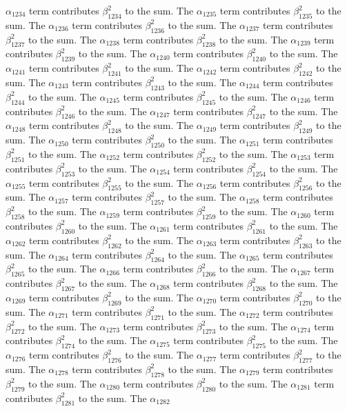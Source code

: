 \begin{lemma}
$\alpha_{1234}$ term contributes $\beta_{1234}^{2}$ to the sum. The $\alpha_{1235}$ term contributes $\beta_{1235}^{2}$ to the sum. The $\alpha_{1236}$ term contributes $\beta_{1236}^{2}$ to the sum. The $\alpha_{1237}$ term contributes $\beta_{1237}^{2}$ to the sum. The $\alpha_{1238}$ term contributes $\beta_{1238}^{2}$ to the sum. The $\alpha_{1239}$ term contributes $\beta_{1239}^{2}$ to the sum. The $\alpha_{1240}$ term contributes $\beta_{1240}^{2}$ to the sum. The $\alpha_{1241}$ term contributes $\beta_{1241}^{2}$ to the sum. The $\alpha_{1242}$ term contributes $\beta_{1242}^{2}$ to the sum. The $\alpha_{1243}$ term contributes $\beta_{1243}^{2}$ to the sum. The $\alpha_{1244}$ term contributes $\beta_{1244}^{2}$ to the sum. The $\alpha_{1245}$ term contributes $\beta_{1245}^{2}$ to the sum. The $\alpha_{1246}$ term contributes $\beta_{1246}^{2}$ to the sum. The $\alpha_{1247}$ term contributes $\beta_{1247}^{2}$ to the sum. The $\alpha_{1248}$ term contributes $\beta_{1248}^{2}$ to the sum. The $\alpha_{1249}$ term contributes $\beta_{1249}^{2}$ to the sum. The $\alpha_{1250}$ term contributes $\beta_{1250}^{2}$ to the sum. The $\alpha_{1251}$ term contributes $\beta_{1251}^{2}$ to the sum. The $\alpha_{1252}$ term contributes $\beta_{1252}^{2}$ to the sum. The $\alpha_{1253}$ term contributes $\beta_{1253}^{2}$ to the sum. The $\alpha_{1254}$ term contributes $\beta_{1254}^{2}$ to the sum. The $\alpha_{1255}$ term contributes $\beta_{1255}^{2}$ to the sum. The $\alpha_{1256}$ term contributes $\beta_{1256}^{2}$ to the sum. The $\alpha_{1257}$ term contributes $\beta_{1257}^{2}$ to the sum. The $\alpha_{1258}$ term contributes $\beta_{1258}^{2}$ to the sum. The $\alpha_{1259}$ term contributes $\beta_{1259}^{2}$ to the sum. The $\alpha_{1260}$ term contributes $\beta_{1260}^{2}$ to the sum. The $\alpha_{1261}$ term contributes $\beta_{1261}^{2}$ to the sum. The $\alpha_{1262}$ term contributes $\beta_{1262}^{2}$ to the sum. The $\alpha_{1263}$ term contributes $\beta_{1263}^{2}$ to the sum. The $\alpha_{1264}$ term contributes $\beta_{1264}^{2}$ to the sum. The $\alpha_{1265}$ term contributes $\beta_{1265}^{2}$ to the sum. The $\alpha_{1266}$ term contributes $\beta_{1266}^{2}$ to the sum. The $\alpha_{1267}$ term contributes $\beta_{1267}^{2}$ to the sum. The $\alpha_{1268}$ term contributes $\beta_{1268}^{2}$ to the sum. The $\alpha_{1269}$ term contributes $\beta_{1269}^{2}$ to the sum. The $\alpha_{1270}$ term contributes $\beta_{1270}^{2}$ to the sum. The $\alpha_{1271}$ term contributes $\beta_{1271}^{2}$ to the sum. The $\alpha_{1272}$ term contributes $\beta_{1272}^{2}$ to the sum. The $\alpha_{1273}$ term contributes $\beta_{1273}^{2}$ to the sum. The $\alpha_{1274}$ term contributes $\beta_{1274}^{2}$ to the sum. The $\alpha_{1275}$ term contributes $\beta_{1275}^{2}$ to the sum. The $\alpha_{1276}$ term contributes $\beta_{1276}^{2}$ to the sum. The $\alpha_{1277}$ term contributes $\beta_{1277}^{2}$ to the sum. The $\alpha_{1278}$ term contributes $\beta_{1278}^{2}$ to the sum. The $\alpha_{1279}$ term contributes $\beta_{1279}^{2}$ to the sum. The $\alpha_{1280}$ term contributes $\beta_{1280}^{2}$ to the sum. The $\alpha_{1281}$ term contributes $\beta_{1281}^{2}$ to the sum. The $\alpha_{1282}$ 
\end{lemma}
